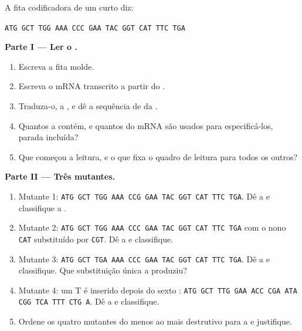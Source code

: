 \begin{problem}
\label{pb:g11:gene-expression:1}
A fita codificadora de um  curto diz:
\begin{center}
\texttt{ATG GCT TGG AAA CCC GAA TAC GGT CAT TTC TGA}
\end{center}

\medskip
\noindent\textbf{Parte I --- Ler o .}
\begin{enumerate}
  \item Escreva a fita molde.
  \item Escreva o mRNA transcrito a partir do .
  \item Traduza-o,  a , e dê a sequência de  da
        .
  \item Quantos  a  contém, e quantos 
        do mRNA são usados para especificá-los, parada incluída?
  \item Que  começou a leitura, e o que fixa o quadro de leitura
        para todos os outros?
\end{enumerate}

\medskip
\noindent\textbf{Parte II --- Três mutantes.}
\begin{enumerate}[resume]
  \item Mutante 1: \texttt{ATG GCT TGG AAA CCG GAA TAC GGT CAT TTC TGA}.
        Dê a  e classifique a .
  \item Mutante 2: \texttt{ATG GCT TGG AAA CCC GAA TAC GGT CAT TTC TGA}
        com o nono  \texttt{CAT} substituído por \texttt{CGT}.
        Dê a  e classifique.
  \item Mutante 3: \texttt{ATG GCT TGA AAA CCC GAA TAC GGT CAT TTC TGA}.
        Dê a  e classifique. Que substituição única a produziu?
  \item Mutante 4: um T é inserido depois do sexto :
        \texttt{ATG GCT TTG GAA ACC CGA ATA CGG TCA TTT CTG A}. Dê a
         e classifique.
  \item Ordene os quatro mutantes do menos ao mais destrutivo para a
         e justifique.
\end{enumerate}


\end{problem}
